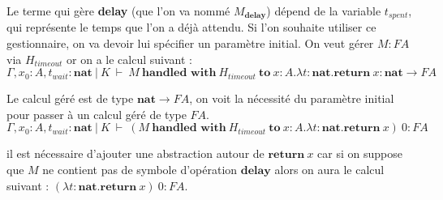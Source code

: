 	Le terme qui gère \textbf{delay} (que l'on va nommé $M_\textbf{delay}$) dépend de la variable $t_{spent}$, qui représente le temps que l'on a déjà attendu.
	Si l'on souhaite utiliser ce gestionnaire, on va devoir lui spécifier un paramètre initial. On veut gérer $M:FA$ via $H_{timeout}$ or on a le calcul suivant :
	\[\Gamma,x_0:A,t_{wait}:\textbf{nat}~|~K~\vdash~M~\textbf{handled~with}~H_{timeout}~\textbf{to}~x:A.\lambda t:\textbf{nat}.\textbf{return}~x:\textbf{nat} \rightarrow FA\]
	
	Le calcul géré est de type $\textbf{nat} \rightarrow FA$, on voit la nécessité du paramètre initial pour passer à un calcul géré de type $FA$.
	\[\Gamma,x_0:A,t_{wait}:\textbf{nat}~|~K~\vdash~(M~\textbf{handled~with}~H_{timeout}~\textbf{to}~x:A.\lambda t:\textbf{nat}.\textbf{return}~x)~0:FA\]
	
	il est nécessaire d'ajouter une abstraction autour de $\textbf{return}~x$ car si on suppose que $M$ ne contient pas de symbole d'opération $\textbf{delay}$ alors on aura le calcul suivant : $(\lambda t:\textbf{nat}.\textbf{return}~x)~0:FA$. 
	\bigbreak
	
